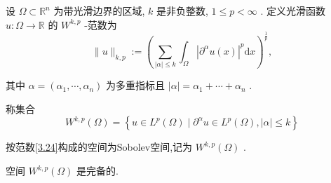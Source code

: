 \documentclass[lang=cn,newtx,10pt,scheme=chinese,thmcnt=chapter]{elegantbook}
\newcommand{\dif}{\mathrm{d}}
\begin{document}
设 \(\Omega  \subset  {\mathbb{R}}^{n}\) 为带光滑边界的区域, \(k\) 是非负整数, \(1 \leqslant  p < \infty\) . 定义光滑函数 \(u : \Omega  \rightarrow  \mathbb{R}\) 的 \({W}^{k,p}\) -范数为
\begin{equation}
\parallel u{\parallel }_{k,p} \mathrel{\text{ := }} {\left( \mathop{\sum }\limits_{{\left| \alpha \right|  \leqslant  k}}{\int }_{\Omega }{\left| {\partial }^{\alpha }u\left( x\right) \right| }^{p}\dif x\right) }^{\frac{1}{p}}, \label{3.24}
\end{equation}

其中 \(\alpha  = \left( {{\alpha }_{1},\cdots ,{\alpha }_{n}}\right)\) 为多重指标且 \(\left| \alpha \right|  = {\alpha }_{1} + \cdots  + {\alpha }_{n}\) .
\begin{definition}
    称集合
\begin{equation*}
{W}^{k,p}\left( \Omega \right)  = \left\{  {u \in  {L}^{p}\left( \Omega \right)  \mid  {\partial }^{\alpha }u \in  {L}^{p}\left( \Omega \right) ,\left| \alpha \right|  \leqslant  k}\right\}
\end{equation*}

按范数\ref{3.24}构成的空间为Sobolev空间,记为 \({W}^{k,p}\left( \Omega \right)\) .
\end{definition}
\begin{theorem}
     空间 \({W}^{k,p}\left( \Omega \right)\) 是完备的.
\end{theorem}
\end{document}
